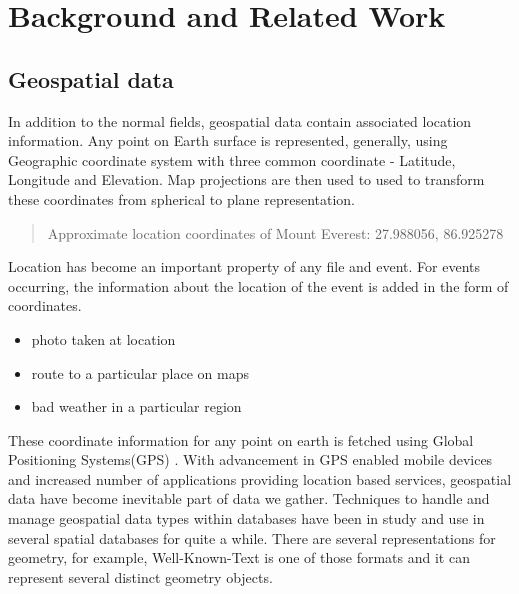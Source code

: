 \documentclass[article,type=msc,colorback,12pt,accentcolor=tud1d]{tudthesis}
\begin{document}
	\clearpage

	\hfill
  \section{Background and Related Work} \label{bg}
  \hfill
	  
		   \subsection{Geospatial data }
			   \par In addition to the normal fields, geospatial data contain associated location information. Any point on Earth surface is represented, generally, using Geographic coordinate system with three common coordinate - Latitude, Longitude and Elevation. Map projections are then used to used to transform these coordinates from spherical to plane representation. 
			   
			   \begin{quote}
			   	\centering  Approximate location coordinates of Mount Everest: 27.988056, 86.925278  \cite{MtEverest}
			   \end{quote}
			  
			   
			   Location has become an important property of any file and event. For events occurring, the information about the location of the event is added in the form of coordinates.   
			   
			   \begin{itemize}
			   	\item photo taken at location
			   	\item route to a particular place on maps
			   	\item bad weather in a particular region
			   	
			   \end{itemize}
			   
			   These coordinate information for any point on earth is fetched using Global Positioning Systems(GPS) \cite{wiki:gps}. With advancement in GPS enabled mobile devices and increased number of applications providing location based services, geospatial data have become inevitable part of data we gather. Techniques to handle and manage geospatial data types within databases have been in study and use in several spatial databases for quite a while. There are several representations for geometry, for example, Well-Known-Text is one of those formats and it can represent several distinct geometry objects.
			   
\end{document}
